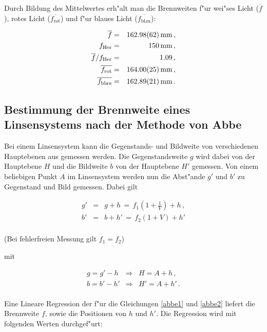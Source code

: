 		Durch Bildung des Mittelwertes erh"alt man die Brennweiten f"ur wei"ses Licht ($\overline{f}$),
		rotes Licht ($\overline{f_\mathrm{rot}}$) und f"ur blaues Licht ($\overline{f_\mathrm{blau}}$):

		\begin{eqnarray*}
			\overline{f} & = & \SI{162.98 (62)}{\milli \meter} \, , \\
			f_\mathrm{Her} & = & \SI{150}{\milli \meter} \, , \\
			\overline{f}/f_\mathrm{Her} & = & \SI{1.09}{} \, , \\
			\overline{f_\mathrm{rot}} & = & \SI{164.00 (25)}{\milli \meter} \, , \\
			\overline{f_\mathrm{blau}} & = & \SI{162.89 (21)}{\milli \meter} \, .
		\end{eqnarray*}

	\subsection{Bestimmung der Brennweite eines Linsensystems nach der Methode von Abbe}
		\label{subsec:abbe}
		Bei einem Linsensystem kann die Gegenstands- und Bildweite von verschiedenen Hauptebenen aus gemessen werden.
		Die Gegenstandsweite $g$ wird dabei von der Hauptebene $H$ und die Bildweite $b$ von der Hauptebene $H'$ gemessen.
		Von einem beliebigen Punkt $A$ im Linsensystem werden nun die Abst"ande $g'$ und $b'$ zu Gegenstand und Bild gemessen.
		Dabei gilt

		\begin{eqnarray}
			g' & = & g + h \, = \, f_1 \left(1 + \frac{1}{V}\right) + h \, , \label{abbe1}\\
			b' & = & b + h' \, = \, f_2 \left(1 + {V}\right) + h' \label{abbe2}\\
		\end{eqnarray}

		\begin{center}
			\tiny {(Bei fehlerfreien Messung gilt $f_1 = f_2$)}
		\end{center}

		mit

		\begin{eqnarray*}
			g = g' - h & \Rightarrow & H = A + h \, , \\
			b = b' - h' & \Rightarrow & H' = A + h' \, .\\
		\end{eqnarray*}

		Eine Lineare Regression der f"ur die Gleichungen \eqref{abbe1} und \eqref{abbe2} liefert die Brennweite $f$, sowie die Positionen von $h$ und $h'$.
		Die Regression wird mit folgenden Werten durchgef"urt:

